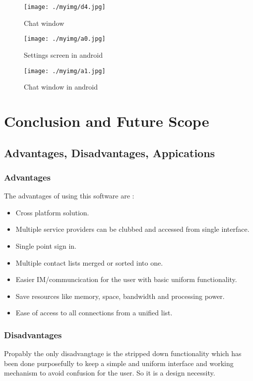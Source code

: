 \documentclass{SureshLimkar}
\begin{document}
\begin{figure}%
\centering
\texttt{[image: ./myimg/d4.jpg]}
\caption{Chat window}%
\label{Chat window}%
\end{figure}


\begin{figure}[h]%
\centering
\texttt{[image: ./myimg/a0.jpg]}
\caption{Settings screen in android}%
\label{Settings screen in android}%
\end{figure}

\begin{figure}[h]%
\centering
\texttt{[image: ./myimg/a1.jpg]}
\caption{Chat window in android}%
\label{Chat window in android}%
\end{figure}


\newpage
\chapter{Conclusion and Future Scope}
\section{Advantages, Disadvantages, Appications}
\subsection{Advantages}
The advantages of using this software are :
\begin{itemize}

\item Cross platform solution.
\item Multiple service providers can be clubbed and accessed from single interface.
\item Single point sign in.
\item Multiple contact lists merged or sorted into one.
\item Easier IM/communcication for the user with basic uniform functionality.
\item Save resources like memory, space, bandwidth and processing power.
\item Ease of access to all connections from a unified list.
\end{itemize}
\subsection{Disadvantages}
\hspace{0.5 in} Propably the only disadvangtage is the stripped down functionality which has been done purposefully to keep a simple and uniform interface and working mechanism to avoid confusion for the user. So it is a design necessity.\\
\end{document}
